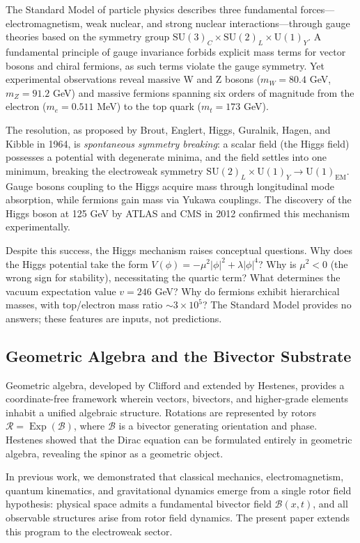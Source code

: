 \documentclass[11pt,a4paper]{article}
\newcommand{\Exp}{\operatorname{Exp}}
\newcommand{\Rotor}{\mathcal{R}}
\newcommand{\Biv}{\mathcal{B}}
\newcommand{\SU}{\mathrm{SU}}
\newcommand{\U}{\mathrm{U}}
\theoremstyle{definition}
\theoremstyle{plain}
\theoremstyle{remark}
\begin{document}
The Standard Model of particle physics describes three fundamental forces---electromagnetism, weak nuclear, and strong nuclear interactions---through gauge theories based on the symmetry group $\SU(3)_C \times \SU(2)_L \times \U(1)_Y$. A fundamental principle of gauge invariance forbids explicit mass terms for vector bosons and chiral fermions, as such terms violate the gauge symmetry. Yet experimental observations reveal massive W and Z bosons ($m_W = 80.4$ GeV, $m_Z = 91.2$ GeV) and massive fermions spanning six orders of magnitude from the electron ($m_e = 0.511$ MeV) to the top quark ($m_t = 173$ GeV).

The resolution, as proposed by Brout, Englert, Higgs, Guralnik, Hagen, and Kibble in 1964, is \emph{spontaneous symmetry breaking}: a scalar field (the Higgs field) possesses a potential with degenerate minima, and the field settles into one minimum, breaking the electroweak symmetry $\SU(2)_L \times \U(1)_Y \to \U(1)_{\text{EM}}$. Gauge bosons coupling to the Higgs acquire mass through longitudinal mode absorption, while fermions gain mass via Yukawa couplings. The discovery of the Higgs boson at 125 GeV by ATLAS and CMS in 2012 confirmed this mechanism experimentally.

Despite this success, the Higgs mechanism raises conceptual questions. Why does the Higgs potential take the form $V(\phi) = -\mu^2|\phi|^2 + \lambda|\phi|^4$? Why is $\mu^2 < 0$ (the wrong sign for stability), necessitating the quartic term? What determines the vacuum expectation value $v = 246$ GeV? Why do fermions exhibit hierarchical masses, with top/electron mass ratio $\sim 3 \times 10^5$? The Standard Model provides no answers; these features are inputs, not predictions.

\subsection{Geometric Algebra and the Bivector Substrate}

Geometric algebra, developed by Clifford and extended by Hestenes, provides a coordinate-free framework wherein vectors, bivectors, and higher-grade elements inhabit a unified algebraic structure. Rotations are represented by rotors $\Rotor = \Exp(\Biv)$, where $\Biv$ is a bivector generating orientation and phase. Hestenes showed that the Dirac equation can be formulated entirely in geometric algebra, revealing the spinor as a geometric object.

In previous work, we demonstrated that classical mechanics, electromagnetism, quantum kinematics, and gravitational dynamics emerge from a single rotor field hypothesis: physical space admits a fundamental bivector field $\Biv(x,t)$, and all observable structures arise from rotor field dynamics. The present paper extends this program to the electroweak sector.
\end{document}
